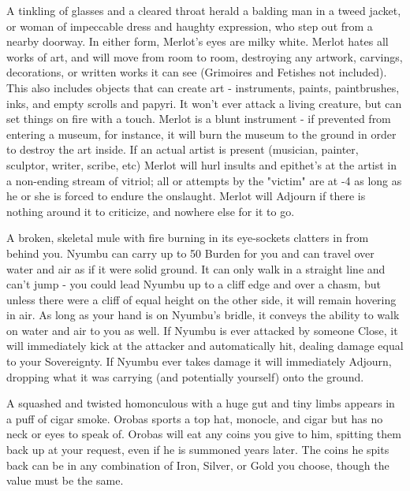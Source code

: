 
A tinkling of glasses and a cleared throat herald a balding man in a tweed jacket, or woman of impeccable dress and haughty expression, who step out from a nearby doorway.  In either form, Merlot's eyes are milky white.  Merlot hates all works of art, and will move from room to room, destroying any artwork, carvings, decorations, or written works it can see (Grimoires and Fetishes not included).  This also includes objects that can create art - instruments, paints, paintbrushes, inks, and empty scrolls and papyri.  It won't ever attack a living creature, but can set things on fire with a touch.  Merlot is a blunt instrument - if prevented from entering a museum, for instance, it will burn the museum to the ground in order to destroy the art inside.  If an actual artist is present (musician, painter, sculptor, writer, scribe, etc) Merlot will hurl insults and epithet's at the artist in a non-ending stream of vitriol; all \RO or \RB attempts by the "victim" are at -4 as long as he or she is forced to endure the onslaught.  Merlot will Adjourn if there is nothing around it to criticize, and nowhere else for it to go.



A broken, skeletal mule with fire burning in its eye-sockets clatters in from behind you.  Nyumbu can carry up to 50 Burden for you and can travel over water and air as if it were solid ground.  It can only walk in a straight line and can't jump - you could lead Nyumbu up to a cliff edge and over a chasm, but unless there were a cliff of equal height on the other side, it will remain hovering in air.  As long as your hand is on Nyumbu's bridle, it conveys the ability to walk on water and air to you as well.  If Nyumbu is ever attacked by someone Close, it will immediately kick at the attacker and automatically hit, dealing damage equal to your Sovereignty. If Nyumbu ever takes damage it will immediately Adjourn, dropping what it was carrying (and potentially yourself) onto the ground.


A squashed and twisted homonculous with a huge gut and tiny limbs appears in a puff of cigar smoke.  Orobas sports a top hat, monocle, and cigar but has no neck or eyes to speak of.  Orobas will eat any coins you give to him, spitting them back up at your request, even if he is summoned years later. The coins he spits back can be in any combination of Iron, Silver, or Gold you choose, though the value must be the same. 


